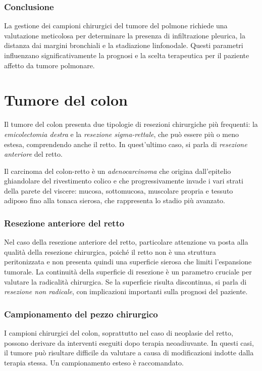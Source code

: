 \subsubsection{Conclusione}
La gestione dei campioni chirurgici del tumore del polmone richiede una valutazione meticolosa per determinare la presenza di infiltrazione pleurica, la distanza dai margini bronchiali e la stadiazione linfonodale. Questi parametri influenzano significativamente la prognosi e la scelta terapeutica per il paziente affetto da tumore polmonare.

\section{Tumore del colon}
Il tumore del colon presenta due tipologie di resezioni chirurgiche più frequenti: la \textit{emicolectomia destra} e la \textit{resezione sigma-rettale}, che può essere più o meno estesa, comprendendo anche il retto. In quest'ultimo caso, si parla di \textit{resezione anteriore} del retto.

Il carcinoma del colon-retto è un \textit{adenocarcinoma} che origina dall'epitelio ghiandolare del rivestimento colico e che progressivamente invade i vari strati della parete del viscere: mucosa, sottomucosa, muscolare propria e tessuto adiposo fino alla tonaca sierosa, che rappresenta lo stadio più avanzato.

\subsubsection{Resezione anteriore del retto}
Nel caso della resezione anteriore del retto, particolare attenzione va posta alla qualità della resezione chirurgica, poiché il retto non è una struttura peritonizzata e non presenta quindi una superficie sierosa che limiti l'espansione tumorale. La continuità della superficie di resezione è un parametro cruciale per valutare la radicalità chirurgica. Se la superficie risulta discontinua, si parla di \textit{resezione non radicale}, con implicazioni importanti sulla prognosi del paziente.

\subsubsection{Campionamento del pezzo chirurgico}
I campioni chirurgici del colon, soprattutto nel caso di neoplasie del retto, possono derivare da interventi eseguiti dopo terapia neoadiuvante. In questi casi, il tumore può risultare difficile da valutare a causa di modificazioni indotte dalla terapia stessa. Un campionamento esteso è raccomandato. 

